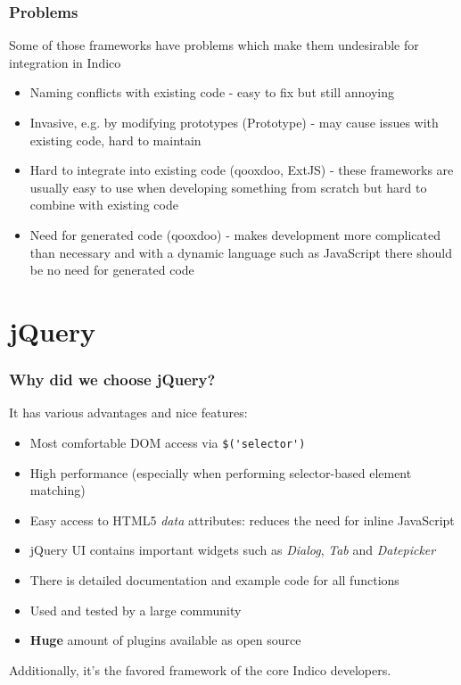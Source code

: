 \documentclass{beamer}
\begin{document}
\begin{frame}
  \frametitle{Problems}
  Some of those frameworks have problems which make them undesirable for integration in Indico
  \begin{itemize}
    \item Naming conflicts with existing code - easy to fix but still annoying
    \item Invasive, e.g. by modifying prototypes (Prototype) - may cause issues with existing code,
      hard to maintain
    \item Hard to integrate into existing code (qooxdoo, ExtJS) - these frameworks are usually easy
      to use when developing something from scratch but hard to combine with existing code
    \item Need for generated code (qooxdoo) - makes development more complicated than necessary and
      with a dynamic language such as JavaScript there should be no need for generated code
  \end{itemize}
\end{frame}

\section{jQuery}
\begin{frame}
  \frametitle{Why did we choose jQuery?}
  It has various advantages and nice features:
  \begin{itemize}
    \item Most comfortable DOM access via \lstinline{$('selector')}
    \item High performance (especially when performing selector-based element matching)
    \item Easy access to HTML5 \emph{data} attributes: reduces the need for inline JavaScript
    \item jQuery UI contains important widgets such as \emph{Dialog}, \emph{Tab} and \emph{Datepicker}
    \item There is detailed documentation and example code for all functions
    \item Used and tested by a large community
    \item \textbf{Huge} amount of plugins available as open source
  \end{itemize}

  Additionally, it's the favored framework of the core Indico developers.
\end{frame}
\end{document}
